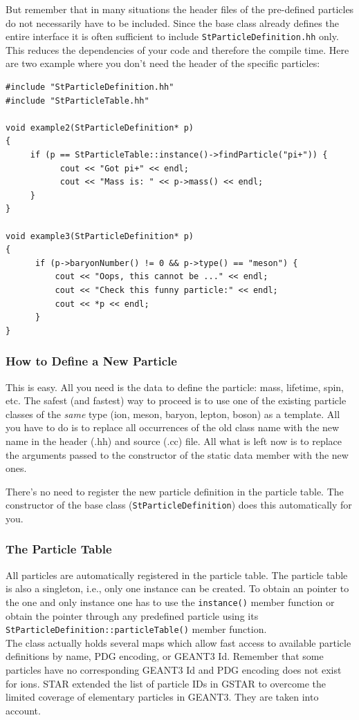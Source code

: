 \documentclass[twoside]{article}
\newcommand{\comp}[1]{\texttt{#1}}%
\begin{document}
\begin{description}
But remember that in many situations the header files of the pre-defined particles
do not necessarily have to be included. Since the base class already defines the
entire interface it is often sufficient to include \comp{StParticleDefinition.hh} only. This
reduces the dependencies of your code and therefore the compile time.
Here are two example where you don't need the header of the specific particles: 

{\footnotesize
\begin{verbatim}
#include "StParticleDefinition.hh"
#include "StParticleTable.hh"

void example2(StParticleDefinition* p)
{
     if (p == StParticleTable::instance()->findParticle("pi+")) {
           cout << "Got pi+" << endl;
           cout << "Mass is: " << p->mass() << endl;
     }
}

void example3(StParticleDefinition* p)
{
      if (p->baryonNumber() != 0 && p->type() == "meson") {
          cout << "Oops, this cannot be ..." << endl;
          cout << "Check this funny particle:" << endl;
          cout << *p << endl;
      }
}
\end{verbatim}
}

\subsubsection{How to Define a New Particle}

This is easy. All you need is the data to define the particle: mass,
lifetime, spin, etc.  The safest (and fastest) way to proceed is to
use one of the existing particle classes of the \emph{same} type (ion,
meson, baryon, lepton, boson) as a template. All you have to do is to
replace all occurrences of the old class name with the new name in the
header (.hh) and source (.cc) file.  All what is left now is to
replace the arguments passed to the constructor of the static data
member with the new ones.

There's no need to register the new particle definition in the
particle table. The constructor of the base class
(\comp{StParticleDefinition}) does this automatically for you.

\subsubsection{The Particle Table}
\label{sec:partTable}

All particles are automatically registered in the particle table. The
particle table is also a singleton, i.e., only one instance can be
created. To obtain an pointer to the one and only instance one has to
use the \comp{instance()} member function or obtain the pointer
through any predefined particle using its
\comp{StParticleDefinition::particleTable()} member function.\\
The class actually holds several maps which allow fast access to
available particle definitions by name, PDG encoding, or GEANT3 Id.
Remember that some particles have no corresponding GEANT3 Id and
PDG encoding does not exist for ions.  STAR extended the list of
particle IDs in GSTAR to overcome the limited coverage of elementary
particles in GEANT3. They are taken into account.


\end{description}
\end{document}
